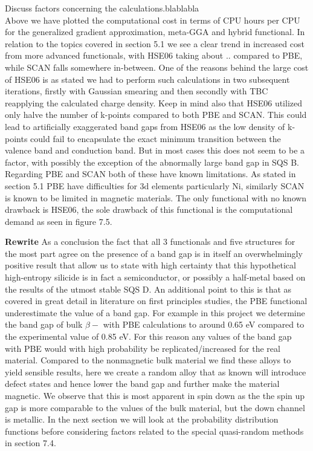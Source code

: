 Discuss factors concerning the calculations.blablabla \\



Above we have plotted the computational cost in terms of CPU hours per CPU for the generalized gradient approximation, meta-GGA and hybrid functional. In relation to the topics covered in section 5.1 we see a clear trend in increased cost from more advanced functionals, with HSE06 taking about .. compared to PBE, while SCAN falls somewhere in-between. One of the reasons behind the large cost of HSE06 is as stated we had to perform such calculations in two subsequent iterations, firstly with Gaussian smearing and then secondly with TBC reapplying the calculated charge density. Keep in mind also that HSE06 utilized only halve the number of k-points compared to both PBE and SCAN. This could lead to artificially exaggerated band gaps from HSE06 as the low density of k-points could fail to encapsulate the exact minimum transition between the valence band and conduction band. But in most cases this does not seem to be a factor, with possibly the exception of the abnormally large band gap in SQS B. Regarding PBE and SCAN both of these have known limitations. As stated in section 5.1 PBE have difficulties for 3d elements particularly Ni, similarly SCAN is known to be limited in magnetic materials. The only functional with no known drawback is HSE06, the sole drawback of this functional is the computational demand as seen in figure 7.5.

\textbf{Rewrite}
As a conclusion the fact that all 3 functionals and five structures for the most part agree on the presence of a band gap is in itself an overwhelmingly positive result that allow us to state with high certainty that this hypothetical high-entropy silicide  is in fact a semiconductor, or possibly a half-metal based on the results of the utmost stable SQS D. An additional point to this is that as covered in great detail in literature on first principles studies, the PBE functional underestimate the value of a band gap. For example in this project we determine the band gap of bulk $\beta-$ with PBE calculations to around 0.65 eV compared to the experimental value of 0.85 eV. For this reason any values of the band gap with PBE would with high probability be replicated/increased for the real material. Compared to the nonmagnetic bulk material we find these alloys to yield sensible results, here we create a random alloy that as known will introduce defect states and hence lower the band gap and further make the material magnetic. We observe that this is most apparent in spin down as the the spin up gap is more comparable to the values of the bulk material, but the down channel is metallic. In the next section we will look at the probability distribution functions before considering factors related to the special quasi-random methods in section 7.4. 


